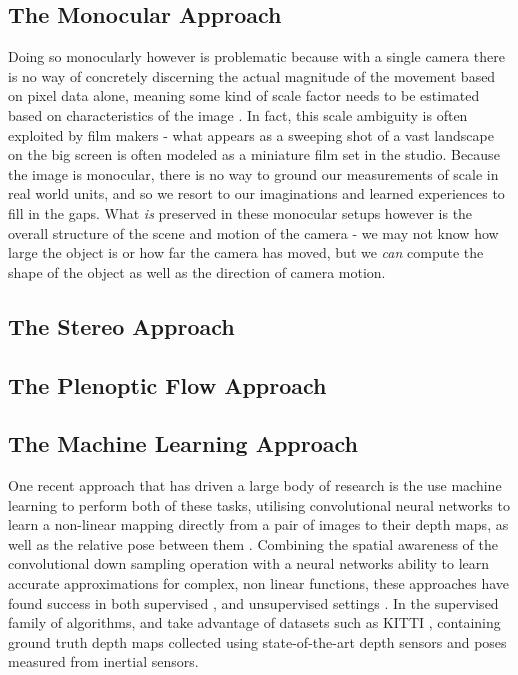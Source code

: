 \documentclass[openany]{book}
\begin{document}
\subsection{The Monocular Approach}
Doing so monocularly however is problematic because with a single camera there is no way of concretely discerning the actual magnitude of the movement based on pixel data alone, meaning some kind of scale factor needs to be estimated based on characteristics of the image \cite{gakne2018scale, nister2004vo, zhou2016scale, zhou2019scale}. In fact, this scale ambiguity is often exploited by film makers - what appears as a sweeping shot of a vast landscape on the big screen is often modeled as a miniature film set in the studio. Because the image is monocular, there is no way to ground our measurements of scale in real world units, and so we resort to our imaginations and learned experiences to fill in the gaps. What \textit{is} preserved in these monocular setups however is the overall structure of the scene and motion of the camera - we may not know how large the object is or how far the camera has moved, but we \textit{can} compute the  shape of the object as well as the direction of camera motion. 

\subsection{The Stereo Approach}


\subsection{The Plenoptic Flow Approach}


\subsection{The Machine Learning Approach}

One recent approach that has driven a large body of research is the use machine learning to perform both of these tasks, utilising convolutional neural networks to learn a non-linear mapping directly from a pair of images to their depth maps, as well as the relative pose between them \cite{eigen2014supervised, garg2016unsupervised,godard2016consistency, liu2015supervised, zhou2017unsupervised}. Combining the spatial awareness of the convolutional down sampling operation with a neural networks ability to learn accurate approximations for complex, non linear functions, these approaches have found success in both supervised \cite{liu2015supervised, eigen2014supervised}, and unsupervised settings \cite{garg2016unsupervised, godard2016consistency, zhou2017unsupervised}. In the supervised family of algorithms, \cite{eigen2014supervised} and \cite{liu2015supervised} take advantage of datasets such as KITTI \cite{dataset-kitti}, containing ground truth depth maps collected using state-of-the-art depth sensors and poses measured from inertial sensors. 
\end{document}
